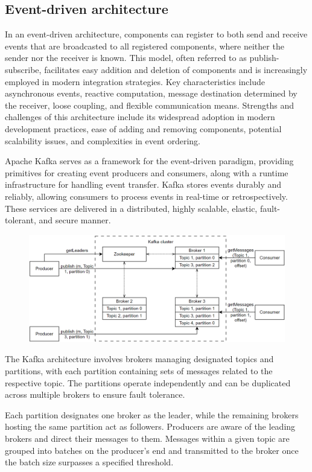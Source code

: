 \subsection{Event-driven architecture}
In an event-driven architecture, components can register to both send and receive events that are broadcasted to all registered components, where neither the sender nor the receiver is known.
This model, often referred to as publish-subscribe, facilitates easy addition and deletion of components and is increasingly employed in modern integration strategies.
Key characteristics include asynchronous events, reactive computation, message destination determined by the receiver, loose coupling, and flexible communication means.
Strengths and challenges of this architecture include its widespread adoption in modern development practices, ease of adding and removing components, potential scalability issues, and complexities in event ordering.

Apache Kafka serves as a framework for the event-driven paradigm, providing primitives for creating event producers and consumers, along with a runtime infrastructure for handling event transfer. 
Kafka stores events durably and reliably, allowing consumers to process events in real-time or retrospectively. 
These services are delivered in a distributed, highly scalable, elastic, fault-tolerant, and secure manner.
\begin{figure}[H]
    \centering
    \includegraphics[width=0.75\linewidth]{images/kafka.png}
\end{figure}
The Kafka architecture involves brokers managing designated topics and partitions, with each partition containing sets of messages related to the respective topic. 
The partitions operate independently and can be duplicated across multiple brokers to ensure fault tolerance.

Each partition designates one broker as the leader, while the remaining brokers hosting the same partition act as followers. 
Producers are aware of the leading brokers and direct their messages to them. 
Messages within a given topic are grouped into batches on the producer's end and transmitted to the broker once the batch size surpasses a specified threshold.

